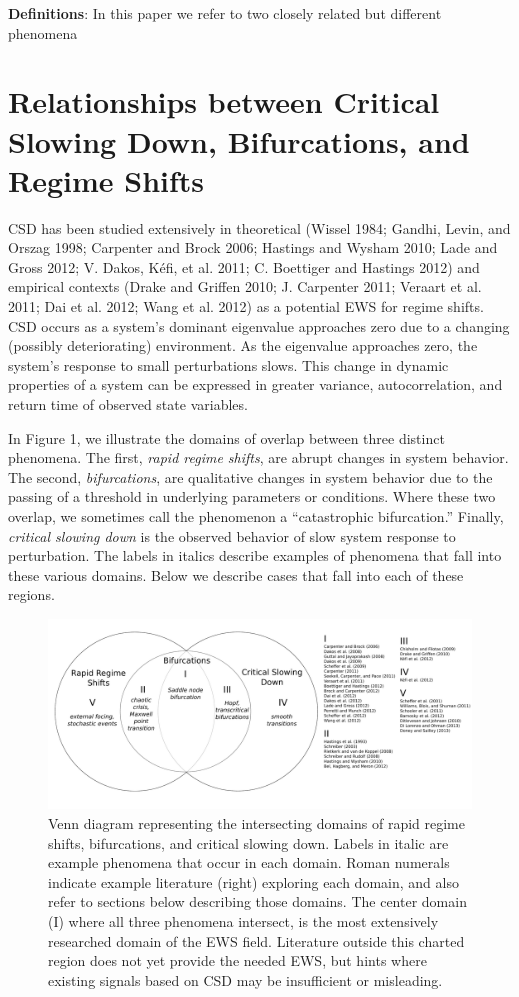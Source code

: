 \documentclass[author-year, review]{elsarticle} %
\makeatletter
\def\maxwidth{\ifdim\Gin@nat@width>\linewidth\linewidth
\else\Gin@nat@width\fi}
\let\Oldincludegraphics\includegraphics
\renewcommand{\includegraphics}[1]{\Oldincludegraphics[width=\maxwidth]{#1}}
\makeatother
\begin{document}
\textbf{Definitions}: In this paper we refer to two closely related but
different phenomena

\section{Relationships between Critical Slowing Down, Bifurcations, and
Regime Shifts}

CSD has been studied extensively in theoretical (Wissel 1984; Gandhi,
Levin, and Orszag 1998; Carpenter and Brock 2006; Hastings and Wysham
2010; Lade and Gross 2012; V. Dakos, Kéfi, et al. 2011; C. Boettiger and
Hastings 2012) and empirical contexts (Drake and Griffen 2010; J.
Carpenter 2011; Veraart et al. 2011; Dai et al. 2012; Wang et al. 2012)
as a potential EWS for regime shifts. CSD occurs as a system's dominant
eigenvalue approaches zero due to a changing (possibly deteriorating)
environment. As the eigenvalue approaches zero, the system's response to
small perturbations slows. This change in dynamic properties of a system
can be expressed in greater variance, autocorrelation, and return time
of observed state variables.

In Figure 1, we illustrate the domains of overlap between three distinct
phenomena. The first, \emph{rapid regime shifts}, are abrupt changes in
system behavior. The second, \emph{bifurcations}, are qualitative
changes in system behavior due to the passing of a threshold in
underlying parameters or conditions. Where these two overlap, we
sometimes call the phenomenon a ``catastrophic bifurcation.'' Finally,
\emph{critical slowing down} is the observed behavior of slow system
response to perturbation. The labels in italics describe examples of
phenomena that fall into these various domains. Below we describe cases
that fall into each of these regions.

\begin{figure}[htbp]
\centering
\includegraphics{ews-venn.pdf}
\caption{Venn diagram representing the intersecting domains of rapid
regime shifts, bifurcations, and critical slowing down. Labels in italic
are example phenomena that occur in each domain. Roman numerals indicate
example literature (right) exploring each domain, and also refer to
sections below describing those domains. The center domain (I) where all
three phenomena intersect, is the most extensively researched domain of
the EWS field. Literature outside this charted region does not yet
provide the needed EWS, but hints where existing signals based on CSD
may be insufficient or misleading.}
\end{figure}
\end{document}
